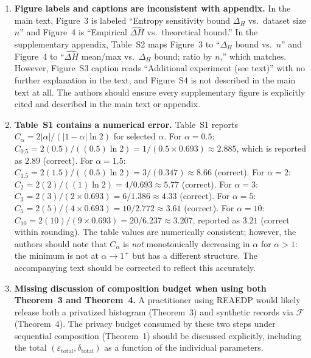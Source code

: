 \documentclass[12pt]{article}
\begin{document}
\begin{enumerate}[label=\textbf{m\arabic*.}, leftmargin=*, wide=0pt]
\item \textbf{Figure labels and captions are inconsistent with appendix.}
In the main text, Figure~3 is labeled ``Entropy sensitivity bound $\Delta_H$ vs.\ dataset size $n$'' and Figure~4 is ``Empirical $\widehat{\Delta H}$ vs.\ theoretical bound.'' In the supplementary appendix, Table~S2 maps Figure~3 to ``$\Delta_H$ bound vs.\ $n$'' and Figure~4 to ``$\widehat{\Delta H}$ mean/max vs.\ $\Delta_H$ bound; ratio by $n$,'' which matches. However, Figure~S3 caption reads ``Additional experiment (see text)'' with no further explanation in the text, and Figure~S4 is not described in the main text at all. The authors should ensure every supplementary figure is explicitly cited and described in the main text or appendix.

\item \textbf{Table~S1 contains a numerical error.}
Table~S1 reports $C_\alpha = 2|\alpha|/(|1-\alpha|\ln 2)$ for selected $\alpha$. For $\alpha = 0.5$: $C_{0.5} = 2(0.5)/((0.5)\ln 2) = 1/(0.5 \times 0.693) \approx 2.885$, which is reported as $2.89$ (correct). For $\alpha = 1.5$: $C_{1.5} = 2(1.5)/((0.5)\ln 2) = 3/(0.347) \approx 8.66$ (correct). For $\alpha = 2$: $C_2 = 2(2)/((1)\ln 2) = 4/0.693 \approx 5.77$ (correct). For $\alpha = 3$: $C_3 = 2(3)/(2 \times 0.693) = 6/1.386 \approx 4.33$ (correct). For $\alpha = 5$: $C_5 = 2(5)/(4 \times 0.693) = 10/2.772 \approx 3.61$ (correct). For $\alpha = 10$: $C_{10} = 2(10)/(9 \times 0.693) = 20/6.237 \approx 3.207$, reported as $3.21$ (correct within rounding). The table values are numerically consistent; however, the authors should note that $C_\alpha$ is \emph{not} monotonically decreasing in $\alpha$ for $\alpha > 1$: the minimum is not at $\alpha \to 1^+$ but has a different structure. The accompanying text should be corrected to reflect this accurately.

\item \textbf{Missing discussion of composition budget when using both Theorem~3 and Theorem~4.}
A practitioner using REAEDP would likely release both a privatized histogram (Theorem~3) and synthetic records via $\mathcal{F}$ (Theorem~4). The privacy budget consumed by these two steps under sequential composition (Theorem~1) should be discussed explicitly, including the total $(\varepsilon_\text{total}, \delta_\text{total})$ as a function of the individual parameters.


\end{enumerate}
\end{document}
